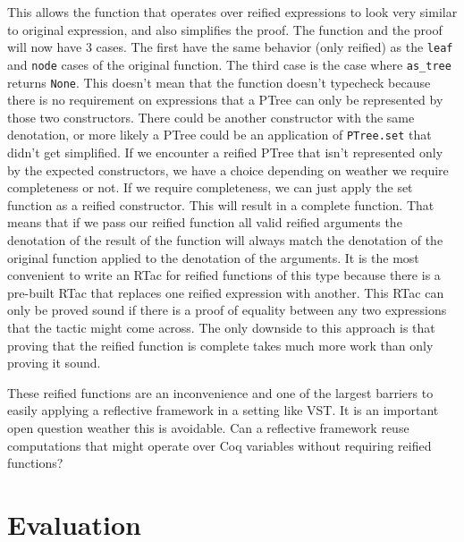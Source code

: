 \documentclass{puthesis}
\begin{document}
This allows the function that operates over reified expressions to look very
similar to original expression, and also simplifies the proof. The function
and the proof will now have 3 cases. The first have the same behavior (only reified)
as the \lstinline|leaf| and \lstinline|node| cases of the original function. The third
case is the case where \lstinline|as_tree| returns \lstinline|None|. This doesn't
mean that the function doesn't typecheck because there is no requirement on 
expressions that a PTree can only be represented by those two constructors. There
could be another constructor with the same denotation, or more likely a PTree
could be an application of \lstinline|PTree.set| that didn't get simplified.
If we encounter a reified PTree that isn't represented
only by the expected constructors, we have a choice depending on
weather we require completeness or not. If we require completeness,
we can just apply the set function as a reified constructor. This
will result in a complete function. That means that if we
pass our reified function all valid reified arguments
the denotation of the result of the function will always
match the denotation of the original function applied
to the denotation of the arguments. It is the most convenient
to write an RTac for reified functions of this type because
there is a pre-built RTac that replaces one reified expression
with another. This RTac can only be proved sound if there is a proof
of equality between any two expressions that the tactic might come
across. The only downside to this approach is that proving that the
reified function is complete takes much more work than only proving it
sound. 

These reified functions are an inconvenience and one of the largest
barriers to easily applying a reflective framework in a setting like
VST. It is an important open question weather this is avoidable. Can
a reflective framework reuse computations that might operate
over Coq variables without requiring reified functions? 

\chapter{Evaluation}
\end{document}
